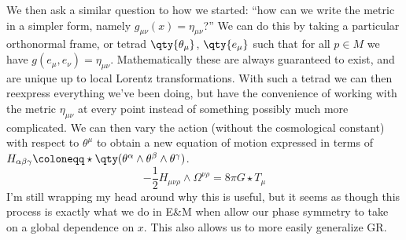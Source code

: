 \documentclass{homework}
\begin{document}
We then ask a similar question to how we started: ``how can we write the metric in a simpler form, namely $g_{\mu\nu}(x) = \eta_{\mu\nu}$?''
We can do this by taking a particular orthonormal frame, or tetrad $\qty{\theta_\mu}$, $\qty{e_\mu}$ such that for all $p\in M$ we have $g(e_\mu, e_\nu) = \eta_{\mu\nu}$.
Mathematically these are always guaranteed to exist, and are unique up to local Lorentz transformations.
With such a tetrad we can then reexpress everything we've been doing, but have the convenience of working with the metric $\eta_{\mu\nu}$ at every point instead of something possibly much more complicated.
We can then vary the action (without the cosmological constant) with respect to $\theta^\mu$ to obtain a new equation of motion expressed in terms of $H_{\alpha\beta\gamma} \defeq \star\qty(\theta^\alpha\wedge\theta^\beta\wedge\theta^\gamma)$.
\begin{equation*}
    -\frac{1}{2}H_{\mu\nu\rho}\wedge\Omega^{\nu\rho} = 8\pi G\star T_\mu
\end{equation*}
I'm still wrapping my head around why this is useful, but it seems as though this process is exactly what we do in E\&M when allow our phase symmetry to take on a global dependence on $x$.
This also allows us to more easily generalize GR.
\end{document}
